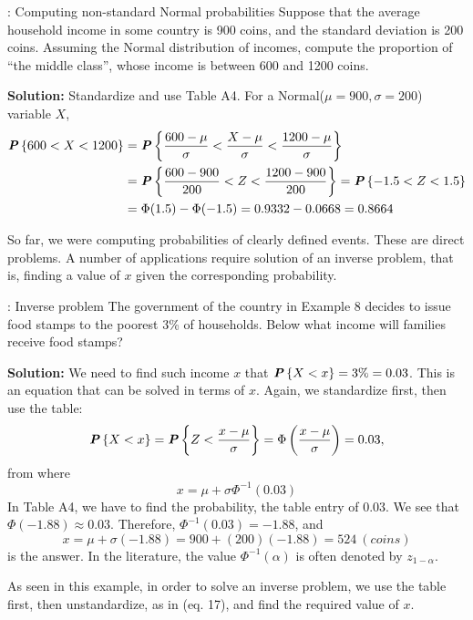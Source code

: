 \begin{example}{: Computing non-standard Normal probabilities}
    Suppose that the average household income in some country is 900 coins, and the standard deviation is 200 coins. Assuming the Normal distribution of incomes, compute the proportion of ``the middle class'', whose income is between 600 and 1200 coins.

    \textbf{Solution:} Standardize and use Table A4. For a Normal($\mu = 900, \sigma = 200$) variable $X$,
    \begin{align*}
        \textbf{\textit{P}}\left\{600 < X < 1200\right\} &= \textbf{\textit{P}}\left\{\frac{600 - \mu}{\sigma} < \frac{X - \mu}{\sigma} < \frac{1200 - \mu}{\sigma}\right\}\\
        &= \textbf{\textit{P}}\left\{\frac{600 - 900}{200} < Z < \frac{1200-900}{200}\right\} = \textbf{\textit{P}}\left\{-1.5 < Z < 1.5\right\}\\
        &= \Phi(1.5) - \Phi(-1.5) = 0.9332 - 0.0668 = 0.8664
    \end{align*}
\end{example}

So far, we were computing probabilities of clearly defined events. These are direct problems. A number of applications require solution of an inverse problem, that is, finding a value of $x$ given the corresponding probability.

\begin{example_break}{: Inverse problem}
    The government of the country in Example 8 decides to issue food stamps to the poorest 3\% of households. Below what income will families receive food stamps?

    \textbf{Solution:} We need to find such income $x$ that $\textbf{\textit{P}}\left\{X < x\right\} = 3\% = 0.03$. This is an equation that can be solved in terms of $x$. Again, we standardize first, then use the table:
    \begin{equation*}
        \textbf{\textit{P}}\left\{X < x\right\} = \textbf{\textit{P}}\left\{Z < \frac{x - \mu}{\sigma}\right\} = \Phi\left( \frac{x - \mu}{\sigma} \right) = 0.03,
    \end{equation*}
    from where
    \begin{equation*}
        x = \mu + \sigma\Phi^{-1}(0.03)
    \end{equation*}
    In Table A4, we have to find the probability, the table entry of 0.03. We see that $\Phi(-1.88) \approx 0.03$. Therefore, $\Phi^{-1}(0.03) = -1.88$, and
    \begin{equation*}
        x = \mu + \sigma(-1.88) = 900 + (200)(-1.88) = 524\ (coins)
    \end{equation*}
    is the answer. In the literature, the value $\Phi^{-1}(\alpha)$ is often denoted by $z_{1-\alpha}$.
\end{example_break}

As seen in this example, in order to solve an inverse problem, we use the table first, then unstandardize, as in (eq. 17), and find the required value of $x$.
